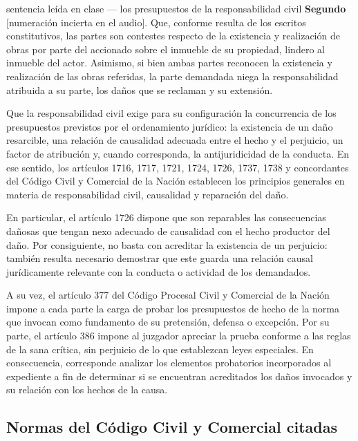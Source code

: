 \documentclass[12pt,oneside]{book}
\begin{document}
\begin{example}{sentencia le\'ida en clase --- los presupuestos de la responsabilidad civil}
\textbf{Segundo} [numeraci\'on incierta en el audio]. Que, conforme resulta de los escritos constitutivos, las partes son contestes respecto de la existencia y realizaci\'on de obras por parte del accionado sobre el inmueble de su propiedad, lindero al inmueble del actor. Asimismo, si bien ambas partes reconocen la existencia y realizaci\'on de las obras referidas, la parte demandada niega la responsabilidad atribuida a su parte, los da\~nos que se reclaman y su extensi\'on.

Que la responsabilidad civil exige para su configuraci\'on la concurrencia de los presupuestos previstos por el ordenamiento jur\'idico: la existencia de un da\~no resarcible, una relaci\'on de causalidad adecuada entre el hecho y el perjuicio, un factor de atribuci\'on y, cuando corresponda, la antijuridicidad de la conducta. En ese sentido, los art\'iculos 1716, 1717, 1721, 1724, 1726, 1737, 1738 y concordantes del C\'odigo Civil y Comercial de la Naci\'on establecen los principios generales en materia de responsabilidad civil, causalidad y reparaci\'on del da\~no.

En particular, el art\'iculo 1726 dispone que son reparables las consecuencias da\~nosas que tengan nexo adecuado de causalidad con el hecho productor del da\~no. Por consiguiente, no basta con acreditar la existencia de un perjuicio: tambi\'en resulta necesario demostrar que este guarda una relaci\'on causal jur\'idicamente relevante con la conducta o actividad de los demandados.

A su vez, el art\'iculo 377 del C\'odigo Procesal Civil y Comercial de la Naci\'on impone a cada parte la carga de probar los presupuestos de hecho de la norma que invocan como fundamento de su pretensi\'on, defensa o excepci\'on. Por su parte, el art\'iculo 386 impone al juzgador apreciar la prueba conforme a las reglas de la sana cr\'itica, sin perjuicio de lo que establezcan leyes especiales. En consecuencia, corresponde analizar los elementos probatorios incorporados al expediente a fin de determinar si se encuentran acreditados los da\~nos invocados y su relaci\'on con los hechos de la causa.
\end{example}

\subsection{Normas del C\'odigo Civil y Comercial citadas}
\end{document}
